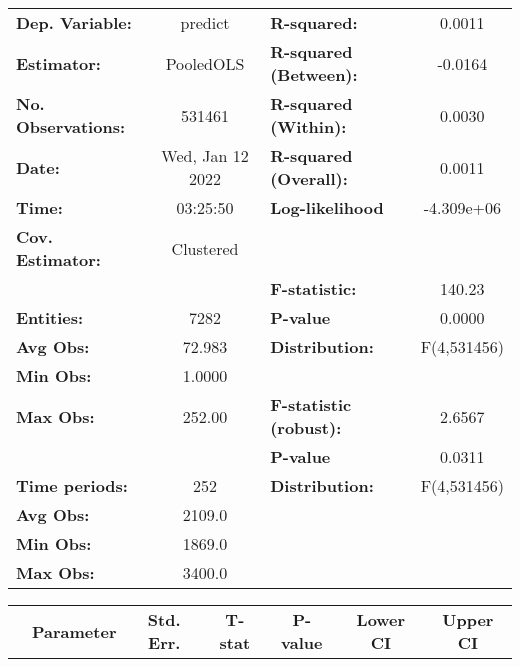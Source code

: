 \begin{center}
\begin{tabular}{lclc}
\toprule
\textbf{Dep. Variable:}    &      predict       & \textbf{  R-squared:         }   &      0.0011      \\
\textbf{Estimator:}        &     PooledOLS      & \textbf{  R-squared (Between):}  &     -0.0164      \\
\textbf{No. Observations:} &       531461       & \textbf{  R-squared (Within):}   &      0.0030      \\
\textbf{Date:}             &  Wed, Jan 12 2022  & \textbf{  R-squared (Overall):}  &      0.0011      \\
\textbf{Time:}             &      03:25:50      & \textbf{  Log-likelihood     }   &    -4.309e+06    \\
\textbf{Cov. Estimator:}   &     Clustered      & \textbf{                     }   &                  \\
\textbf{}                  &                    & \textbf{  F-statistic:       }   &      140.23      \\
\textbf{Entities:}         &        7282        & \textbf{  P-value            }   &      0.0000      \\
\textbf{Avg Obs:}          &       72.983       & \textbf{  Distribution:      }   &   F(4,531456)    \\
\textbf{Min Obs:}          &       1.0000       & \textbf{                     }   &                  \\
\textbf{Max Obs:}          &       252.00       & \textbf{  F-statistic (robust):} &      2.6567      \\
\textbf{}                  &                    & \textbf{  P-value            }   &      0.0311      \\
\textbf{Time periods:}     &        252         & \textbf{  Distribution:      }   &   F(4,531456)    \\
\textbf{Avg Obs:}          &       2109.0       & \textbf{                     }   &                  \\
\textbf{Min Obs:}          &       1869.0       & \textbf{                     }   &                  \\
\textbf{Max Obs:}          &       3400.0       & \textbf{                     }   &                  \\
\bottomrule
\end{tabular}
\begin{tabular}{lcccccc}
                & \textbf{Parameter} & \textbf{Std. Err.} & \textbf{T-stat} & \textbf{P-value} & \textbf{Lower CI} & \textbf{Upper CI}  \\

\end{tabular}
\end{center}
